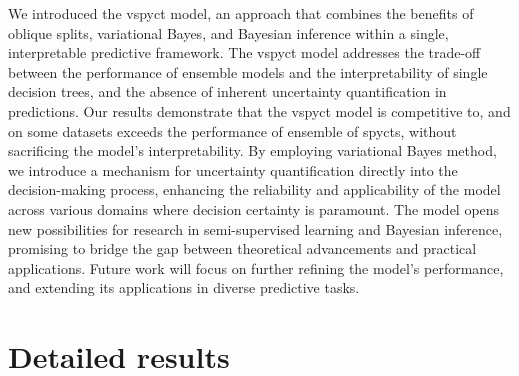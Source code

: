 \documentclass[3p,review,authoryear]{elsarticle}
\begin{document}
We introduced the \gls{vspyct} model, an approach that combines the benefits of oblique splits, variational Bayes, and Bayesian inference within a single, interpretable predictive framework.
The \gls{vspyct} model addresses the trade-off between the performance of ensemble models and the interpretability of single decision trees, and the absence of inherent uncertainty quantification in predictions.
Our results demonstrate that the \gls{vspyct} model is competitive to, and on some datasets exceeds the performance of ensemble of \glspl{spyct}, without sacrificing the model's interpretability.
By employing variational Bayes method, we introduce a mechanism for uncertainty quantification directly into the decision-making process, enhancing the reliability and applicability of the model across various domains where decision certainty is paramount.
The model opens new possibilities for research in semi-supervised learning and Bayesian inference, promising to bridge the gap between theoretical advancements and practical applications.
Future work will focus on further refining the model's performance, and extending its applications in diverse predictive tasks.

\appendix
\section{Detailed results}
\label{app:res}
\end{document}
